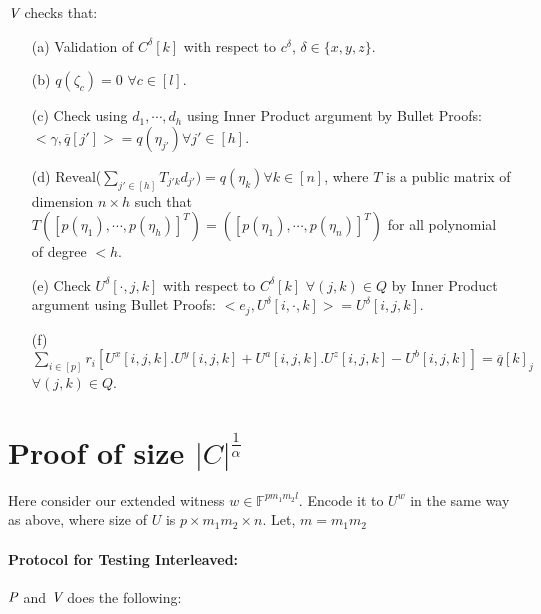 $\V$ checks that:\\
\begin{itemize}
	\item[(a)] Validation of $C^{\delta}[k]$ with respect to $c^{\delta}$, $\delta\in \{x,y,z\}$.
	\item[(b)] $q(\zeta_c)=0$ $\forall c\in [l]$.
	\item[(c)] Check using $d_1,\cdots, d_h$ using Inner Product argument by Bullet Proofs: $<\gamma, \overline{q}[j']>=q(\eta_{j'}) \forall j'\in [h]$.
	\item[(d)] Reveal($\sum\limits_{j'\in [h]} T_{j'k}d_{j'})= q(\eta_k) \forall k\in [n]$, where $T$ is a public matrix of dimension $n\times h$ such that $T([p(\eta_1),\cdots,p(\eta_h)]^T)=([p(\eta_1),\cdots,p(\eta_n)]^T)$ for all polynomial of degree $<h$.
	\item[(e)] Check $U^{\delta}[\cdot,j,k]$ with respect to $C^{\delta}[k]$ $\forall (j,k)\in Q$ by Inner Product argument using Bullet Proofs: $<e_j,U^{\delta}[i,\cdot,k]>=U^{\delta}[i,j,k]$.
	\item[(f)] $\sum\limits_{i\in [p]} r_i[U^x[i,j,k].U^y[i,j,k]+U^a[i,j,k].U^z[i,j,k]-U^b[i,j,k]]=\overline{q}[k]_j$ $\forall (j,k)\in Q$.
\end{itemize}
\section{Proof of size $|C|^{\frac{1}{\alpha}}$}
Here consider our extended witness $w\in \mathbb{F}^{pm_1m_2l}$. Encode it to $U^w$ in the same way as above, where size of $U$ is $p\times m_1m_2\times n$. Let, $m=m_1m_2$\\

\paragraph{Protocol for Testing Interleaved:}
$\P$ and $\V$ does the following:

